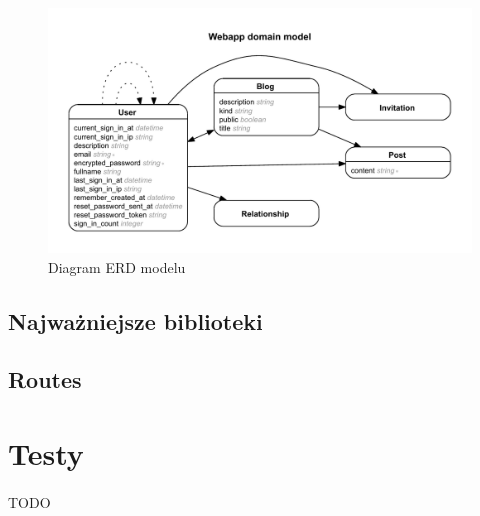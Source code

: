 \documentclass[wide,a4paper,titlepage,12pt] {article}
\begin{document}
      \begin{figure}[h!]
        \begin{center}
          \includegraphics[scale=0.8]{erd.pdf}
        \end{center}
        \caption{Diagram ERD modelu}
        \label{fig:model}
      \end{figure}
      \newpage

      \newpage
      \subsection{Najważniejsze biblioteki}
      \paragraph{}
      \small{
        
      }

      \newpage
      \subsection{Routes}
      \paragraph{}
        \small{
          
        }


      \section{Testy}
      \paragraph{}
      TODO




  
\end{document}
